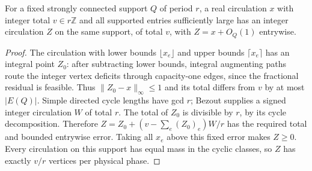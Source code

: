 \begin{lemma}\label{pq:quotas}
For a fixed strongly connected support $Q$ of period $r$, a real circulation $x$ with integer total $v\in{}r\mathbb{Z}$ and all supported entries sufficiently large has an integer circulation $Z$ on the same support, of total $v$, with $Z=x+O_Q(1)$ entrywise.
\end{lemma}
\begin{proof}
The circulation with lower bounds $\lfloor{}x_e\rfloor$ and upper bounds $\lceil{}x_e\rceil$ has an integral point $Z_0$: after subtracting lower bounds, integral augmenting paths route the integer
vertex deficits through capacity-one edges, since the fractional
residual is feasible. Thus $\|Z_0-x\|_\infty\le1$ and its total differs from $v$ by at most $|E(Q)|$. Simple directed cycle lengths have gcd $r$; Bezout supplies a signed integer circulation $W$ of total $r$. The total of $Z_0$ is divisible by $r$, by its cycle decomposition. Therefore $Z=Z_0+(v-\sum_e(Z_0)_e)W/r$ has the required total and bounded entrywise error. Taking all $x_e$ above this fixed error makes $Z\ge0$. Every circulation on this support has equal mass in the cyclic classes, so $Z$ has exactly $v/r$ vertices per physical phase.
\end{proof}
